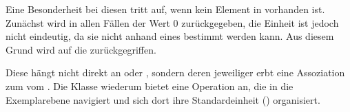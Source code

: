 Eine Besonderheit bei diesen  tritt auf, wenn kein Element in  vorhanden ist.
Zunächst wird in allen Fällen der Wert 0 zurückgegeben, die Einheit ist jedoch nicht eindeutig, da sie nicht anhand
eines  bestimmt werden kann. Aus diesem Grund wird auf die  zurückgegriffen.

Diese hängt nicht direkt an  oder , sondern deren jeweiliger  erbt eine
Assoziation zum  vom . Die Klasse  wiederum
bietet eine Operation  an, die in die Exemplarebene navigiert und sich dort ihre Standardeinheit
() organisiert.